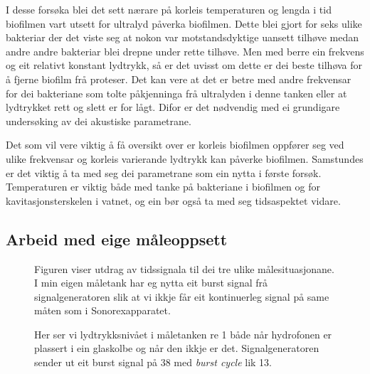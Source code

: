 I desse forsøka blei det sett nærare på korleis temperaturen og lengda i tid biofilmen vart utsett for ultralyd påverka biofilmen. Dette blei gjort for seks ulike bakteriar der det viste seg at nokon var motstandsdyktige uansett tilhøve medan andre andre bakteriar blei drepne under rette tilhøve. Men med berre ein frekvens og eit relativt konstant lydtrykk, så er det uvisst om dette er dei beste tilhøva for å fjerne biofilm frå proteser. Det kan vere at det er betre med andre frekvensar for dei bakteriane som tolte påkjenninga frå ultralyden i denne tanken eller at lydtrykket rett og slett er for lågt. Difor er det nødvendig med ei grundigare undersøking av dei akustiske parametrane.

Det som vil vere viktig å få oversikt over er korleis biofilmen oppfører seg ved ulike frekvensar og korleis varierande lydtrykk kan påverke biofilmen. Samstundes er det viktig å ta med seg dei parametrane som ein nytta i første forsøk. Temperaturen er viktig både med tanke på bakteriane i biofilmen og for kavitasjonsterskelen i vatnet, og ein bør også ta med seg tidsaspektet vidare.

\subsection{Arbeid med eige måleoppsett}
\begin{figure}[htbp]
	\begin{center}
	\end{center}
	\caption[Tidssignala til dei ulike målingane]{Figuren viser utdrag av tidssignala til dei tre ulike målesituasjonane. I min eigen måletank har eg nytta eit burst signal frå signalgeneratoren slik at vi ikkje får eit kontinuerleg signal på same måten som i Sonorexapparatet.}
	\label{fig:tidssignal}
\end{figure}

\begin{figure}[htbp]
\centering
{}
\caption[Lydtrykksnivå i måletanken]{Her ser vi lydtrykksnivået i måletanken re \unit{1}{\micro\pascal} både når hydrofonen er plassert i ein glaskolbe og når den ikkje er det. Signalgeneratoren sender ut eit burst signal på \unit{38}{\kilo\hertz} med \emph{burst cycle} lik 13.}
\label{fig:trykk}
\end{figure}

